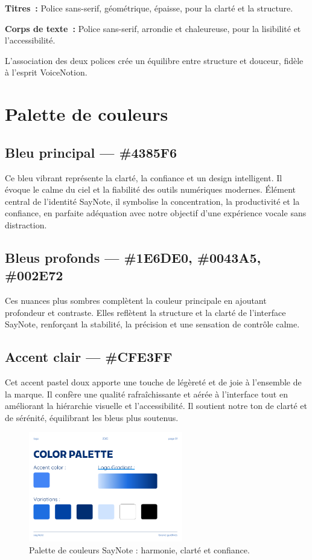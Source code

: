 \textbf{Titres~:}
Police sans-serif, géométrique, épaisse, pour la clarté et la structure.

\textbf{Corps de texte~:}
Police sans-serif, arrondie et chaleureuse, pour la lisibilité et l’accessibilité.

L’association des deux polices crée un équilibre entre structure et douceur, fidèle à l’esprit VoiceNotion.

\section{Palette de couleurs}
\subsection{Bleu principal — \#4385F6}
Ce bleu vibrant représente la clarté, la confiance et un design intelligent. Il évoque le calme du ciel et la fiabilité des outils numériques modernes. Élément central de l’identité SayNote, il symbolise la concentration, la productivité et la confiance, en parfaite adéquation avec notre objectif d’une expérience vocale sans distraction.

\subsection{Bleus profonds — \#1E6DE0, \#0043A5, \#002E72}
Ces nuances plus sombres complètent la couleur principale en ajoutant profondeur et contraste. Elles reflètent la structure et la clarté de l’interface SayNote, renforçant la stabilité, la précision et une sensation de contrôle calme.

\subsection{Accent clair — \#CFE3FF}
Cet accent pastel doux apporte une touche de légèreté et de joie à l’ensemble de la marque. Il confère une qualité rafraîchissante et aérée à l’interface tout en améliorant la hiérarchie visuelle et l’accessibilité. Il soutient notre ton de clarté et de sérénité, équilibrant les bleus plus soutenus.

\begin{figure}[H]
    \centering
    \includegraphics[width=0.6\textwidth]{docs/visual-indentity/pictures/color-palette.png}
    \caption{Palette de couleurs SayNote : harmonie, clarté et confiance.}
\end{figure}

